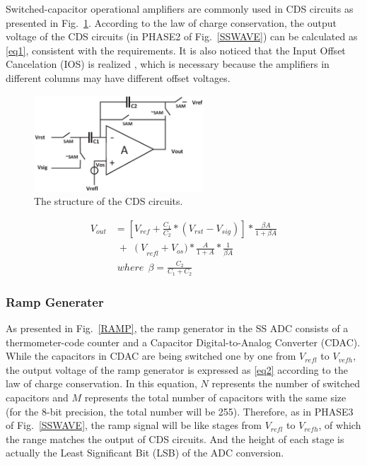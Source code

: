 Switched-capacitor operational amplifiers are commonly used in CDS circuits as presented in Fig.~\ref{CDS}. According to the law of charge conservation, 
the output voltage of the CDS circuits (in PHASE2 of Fig.~\ref{SSWAVE}) can be calculated as \eqref{eq1}, consistent with the requirements. It is also noticed that the Input Offset Cancelation (IOS) is realized \cite{razavi_design_1992}, 
which is necessary because the amplifiers in different columns may have different offset voltages.

\begin{figure}[htbp]
	\centerline{\includegraphics[width=2.5in]{./Figures/CDS.eps}}
	\caption{The structure of the CDS circuits.}
	\label{CDS}
\end{figure} 

\begin{equation}
	\begin{aligned}
		V_{out}&=\left[ V_{ref}+\frac{C_1}{C_2}\ast\left(V_{rst}-V_{sig}\right)\right]\ast\frac{\beta A}{1+\beta A}\\
		&\;{+}\;\left(V\right._{refl}+V_{os})\ast\frac{A}{1+A}\ast\frac{1}{\beta A}\\
		&\;where\ \ \beta=\frac{C_2}{C_1+C_2}
		\label{eq1}
	\end{aligned}
\end{equation}

\subsubsection{Ramp Generater}

As presented in Fig.~\ref{RAMP}, the ramp generator in the SS ADC consists of a thermometer-code counter and a Capacitor Digital-to-Analog Converter (CDAC). 
While the capacitors in CDAC are being switched one by one from $V_{refl}$ to $V_{vefh}$, the output voltage of the ramp generator is expressed as \eqref{eq2} according to the law of charge conservation. 
In this equation, $N$ represents the number of switched capacitors and $M$ represents the total number of capacitors with the same size (for the 8-bit precision, the total number will be 255). 
Therefore, as in PHASE3 of Fig.~\ref{SSWAVE}, the ramp signal will be like stages from $V_{refl}$ to $V_{refh}$, of which the range matches the output of CDS circuits. 
And the height of each stage is actually the Least Significant Bit (LSB) of the ADC conversion.

